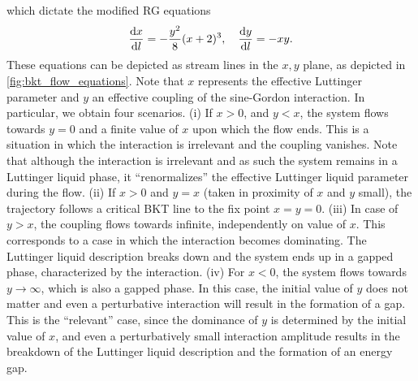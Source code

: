 which dictate the modified RG equations
\begin{align}
    \frac{\mathrm d x}{\mathrm d l} = -\frac{y^2}8(x+2)^3,
    \quad
    \frac{\mathrm d y}{\mathrm d l} = - xy.
\end{align}
These equations can be depicted as stream lines in the $x,y$ plane, as depicted in \cref{fig:bkt_flow_equations}.
Note that $x$ represents the effective Luttinger parameter and $y$ an effective coupling of the sine-Gordon interaction.
In particular, we obtain four scenarios.
(i) If $x>0$, and $y<x$, the system flows towards $y=0$ and a finite value of $x$ upon which the flow ends.
This is a situation in which the interaction is irrelevant and the coupling vanishes.
Note that although the interaction is irrelevant and as such the system remains in a Luttinger liquid phase, it ``renormalizes'' the effective Luttinger liquid parameter during the flow.
(ii) If $x>0$ and $y=x$ (taken in proximity of $x$ and $y$ small), the trajectory follows a critical BKT line to the fix point $x=y=0$.
(iii) In case of $y>x$, the coupling flows towards infinite, independently on value of $x$.
This corresponds to a case in which the interaction becomes dominating.
The Luttinger liquid description breaks down and the system ends up in a gapped phase, characterized by the interaction.
(iv) For $x<0$, the system flows towards $y\rightarrow\infty$, which is also a gapped phase.
In this case, the initial value of $y$ does not matter and even a perturbative interaction will result in the formation of a gap.
This is the ``relevant'' case, since the dominance of $y$ is determined by the initial value of $x$, and even a perturbatively small interaction amplitude results in the breakdown of the Luttinger liquid description and the formation of an energy gap.

